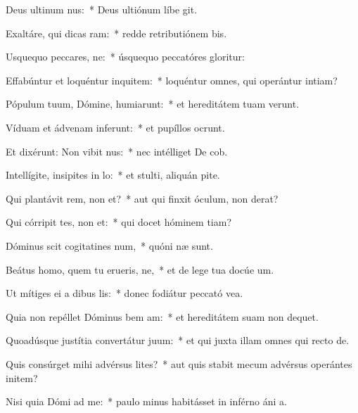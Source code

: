 \item Deus ultinum nus:~* Deus ultiónum líbe git.
\item Exaltáre, qui dicas ram:~* redde retributiónem bis.
\item Usquequo peccares, ne:~* úsquequo peccatóres gloritur:
\item Effabúntur et loquéntur inquitem:~* loquéntur omnes, qui operántur intiam?
\item Pópulum tuum, Dómine, humiarunt:~* et hereditátem tuam verunt.
\item Víduam et ádvenam inferunt:~* et pupíllos ocrunt.
\item Et dixérunt: Non vibit nus:~* nec intélliget De cob.
\item Intellígite, insipites in lo:~* et stulti, aliquán pite.
\item Qui plantávit rem, non et?~* aut qui finxit óculum, non derat?
\item Qui córripit tes, non et:~* qui docet hóminem tiam?
\item Dóminus scit cogitatines num,~* quóni næ sunt.
\item Beátus homo, quem tu erueris, ne,~* et de lege tua docúe um.
\item Ut mítiges ei a dibus lis:~* donec fodiátur peccató vea.
\item Quia non repéllet Dóminus bem am:~* et hereditátem suam non dequet.
\item Quoadúsque justítia convertátur  juum:~* et qui juxta illam omnes qui recto  de.
\item Quis consúrget mihi advérsus lites?~* aut quis stabit mecum advérsus operántes initem?
\item Nisi quia Dómi ad me:~* paulo minus habitásset in inférno áni a.
